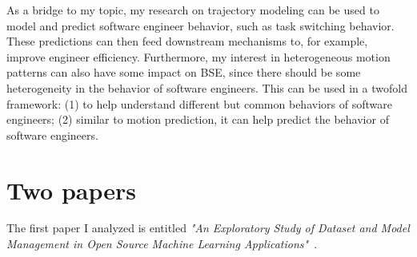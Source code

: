 \documentclass{article}
\begin{document}
As a bridge to my topic, my research on trajectory modeling can be used to model and predict software engineer behavior, such as task switching behavior. These predictions can then feed downstream mechanisms to, for example, improve engineer efficiency. Furthermore, my interest in heterogeneous motion patterns can also have some impact on BSE, since there should be some heterogeneity in the behavior of software engineers. This can be used in a twofold framework: (1) to help understand different but common behaviors of software engineers; (2) similar to motion prediction, it can help predict the behavior of software engineers.

\section{Two papers}


The first paper I analyzed is entitled \emph{"An Exploratory Study of Dataset and Model Management in Open
Source Machine Learning Applications"}~\cite{toma24}.
\end{document}
